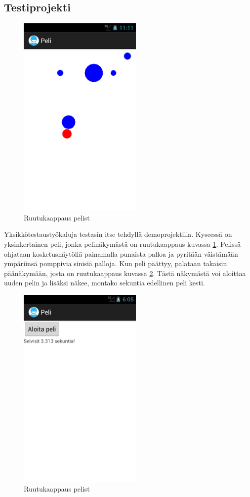 \subsection{Testiprojekti}

\begin{figure}[htb]
\includegraphics[width=60mm]{peli_screenshot.png}
\caption{Ruutukaappaus pelist} \label{peli_screenshot}
\end{figure}

Yksikkötestaustyökaluja testasin itse tehdyllä demoprojektilla. Kyseessä on yksinkertainen peli, jonka pelinäkymästä on ruutukaappaus kuvassa \ref{peli_screenshot}. Pelissä ohjataan kosketusnäytöllä painamalla punaista palloa ja pyritään väistämään ympäriinsä pomppivia sinisiä palloja. Kun peli päättyy, palataan takaisin päänäkymään, josta on ruutukaappaus kuvassa \ref{mainactivity}. Tästä näkymästä voi aloittaa uuden pelin ja lisäksi näkee, montako sekuntia edellinen peli kesti.

\begin{figure}[htb]
\includegraphics[width=60mm]{peli_mainactivity.png}
\caption{Ruutukaappaus pelist} \label{mainactivity}
\end{figure}

